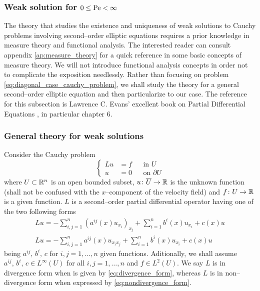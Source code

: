 
\subsubsection{Weak solution for \texorpdfstring{$0 \leq \mathrm{Pe} <
\infty$}{finite Péclet's number}} \label{sec:diagonal_Pe_fin_weak}

The theory that studies the existence and uniqueness of weak solutions to Cauchy
problems involving second--order elliptic equations requires a prior knowledge
in measure theory and functional analysis. The interested reader can consult
appendix \ref{ap:measure_theory} for a quick reference in some basic concepts of
measure theory. We will not introduce functional analysis concepts in order not
to complicate the exposition needlessly. Rather than focusing on problem
\eqref{eq:diagonal_case_cauchy_problem}, we shall study the theory for a general
second--order elliptic equation and then particularize to our case. The
reference for this subsection is Lawrence C. Evans' excellent book on Partial
Differential Equations \cite{evans1998pde}, in particular chapter 6.

\subsubsection*{General theory for weak solutions}

Consider the Cauchy problem
\begin{equation} \label{eq:second_order_elliptic_problem}
	\left\{
		\begin{aligned}
			L u &= f & &\text{in } U \\
			u &= 0 & &\text{on } \partial U
		\end{aligned}
	\right.
\end{equation}
where $U \subset \mathbb{R}^n$ is an open bounded subset, $u \colon \overline{U}
\rightarrow \mathbb{R}$ is the unknown function (shall not be confused with the
$x$--component of the velocity field) and $f \colon U \rightarrow \mathbb{R}$ is a
given function. $L$ is a second--order partial differential operator having one
of the two following forms
\begin{gather}
	L u = - \sum_{i,j=1}^n (a^{ij}(x) u_{x_i})_{x_j} + \sum_{i=1}^n b^i(x) u_{x_i} + c(x) u \label{eq:divergence_form}	\\
	L u = - \sum_{i,j=1}^n a^{ij}(x) u_{x_i x_j} + \sum_{i=1}^n b^i(x) u_{x_i} + c(x) u	
	\label{eq:nondivergence_form}
\end{gather}
being $a^{ij}, \, b^i, \, c$ for $i, j = 1, \ldots, n$ given functions.
Aditionally, we shall assume $a^{ij}, \, b^i, \, c \in L^\infty(U)$ for all $i,
j = 1, \ldots, n$ and $f \in L^2(U)$. We say $L$ is in divergence form when is
given by \eqref{eq:divergence_form}, whereas $L$ is in non--divergence form when
expressed by \eqref{eq:nondivergence_form}.

